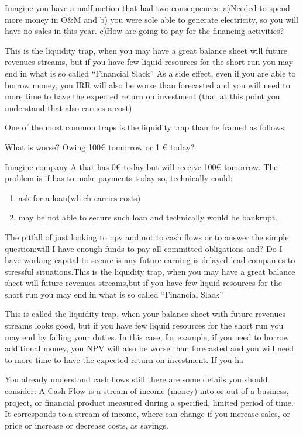 \documentclass[]{book}
\newcommand{\euro}{€}
\theoremstyle{definition}
\theoremstyle{definition}
\theoremstyle{definition}
\theoremstyle{remark}
\begin{document}
Imagine you have a malfunction that had two consequences: a)Needed to
spend more money in O\&M and b) you were sole able to generate
electricity, so you will have no sales in this year. c)How are going to
pay for the financing activities?

This is the liquidity trap, when you may have a great balance sheet will
future revenues streams, but if you have few liquid resources for the
short run you may end in what is so called ``Financial Slack'' As a side
effect, even if you are able to borrow money, you IRR will also be worse
than forecasted and you will need to more time to have the expected
return on investment (that at this point you understand that also
carries a cost)

One of the most common traps is the liquidity trap than be framed as
follows:

What is worse? Owing 100\euro{} tomorrow or 1 \euro{} today?

Imagine company A that has 0\euro{} today but will receive 100\euro{}
tomorrow. The problem is if has to make payments today so, technically
could:

\begin{enumerate}
\def\labelenumi{\Alph{enumi})}
\item
  ask for a loan(which carries costs)
\item
  may be not able to secure such loan and technically would be bankrupt.
\end{enumerate}

The pitfall of just looking to npv and not to cash flows or to answer
the simple question:will I have enough funds to pay all committed
obligations and? Do I have working capital to secure is any future
earning is delayed lead companies to stressful situations.This is the
liquidity trap, when you may have a great balance sheet will future
revenues streams,but if you have few liquid resources for the short run
you may end in what is so called ``Financial Slack''

This is called the liquidity trap, when your balance sheet with future
revenues streams looks good, but if you have few liquid resources for
the short run you may end by failing your duties. In this case, for
example, if you need to borrow additional money, you NPV will also be
worse than forecasted and you will need to more time to have the
expected return on investment. If you ha

You already understand cash flows still there are some details you
should consider: A Cash Flow is a stream of income (money) into or out
of a business, project, or financial product measured during a
specified, limited period of time. It corresponds to a stream of income,
where can change if you increase sales, or price or increase or decrease
costs, as savings.
\end{document}
